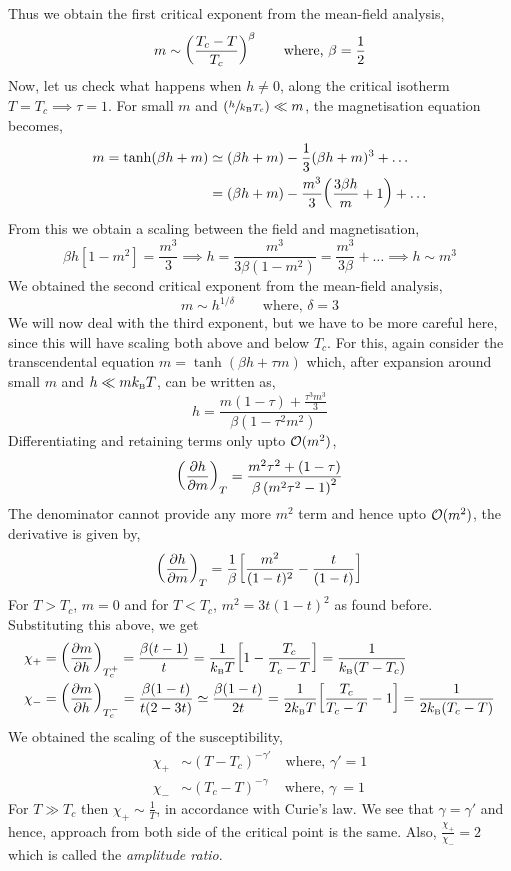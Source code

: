 Thus we obtain the first critical exponent from the mean-field analysis,
$${m\sim \qty(\frac{T_c-T}{T_c})^{\beta} \qquad\text{where, } \beta= \frac{1}{2}}$$
Now, let us check what happens when $h\neq 0$, along the critical isotherm $T=T_c \implies \tau=1$. For small $m$ and $ \qty(\sfrac{h}{k_{\text{\tiny B}} T_c}) \ll m$, the magnetisation equation becomes, 
\begin{align*}
    m = \tanh(\beta h + m) &\simeq (\beta h + m ) -\frac{1}{3}(\beta h + m )^3 + \ldots \\
    &=(\beta h + m ) -\frac{m^3}{3}\qty(\frac{3\beta h}{m} + 1 ) + \ldots
\end{align*}
From this we obtain a scaling between the field and magnetisation,
$$\beta h [1-m^2] = \frac{m^3}{3} \implies h = \frac{m^3}{3\beta(1-m^2)} = \frac{m^3}{3\beta}+\ldots\implies h \sim m^3$$
We obtained the second critical exponent from the mean-field analysis,
$${m\sim h^{1/\delta} \qquad\text{where, } \delta= 3}$$
We will now deal with the third exponent, but we have to be more careful here, since this will have scaling both above and below $T_c$. For this, again consider the transcendental equation $m = \tanh(\beta h + \tau m)$ which, after expansion around small $m$ and $h\ll m k_{\text{\tiny B}} T$, can be written as, 
$$h=\frac{m(1-\tau) +\frac{\tau^3 m^3}{3}}{\beta (1-\tau^2 m^2)}$$
Differentiating and retaining terms only upto $\mathcal O(m^2)$, 
$$\qty(\pdv{h}{m})_T = \frac{ m^2 \tau ^2 +(1-\tau)}{ \beta  \left(m^2 \tau ^2-1\right)^2}$$
The denominator cannot provide any more $m^2$ term and hence upto $\mathcal O(m^2)$, the derivative is given by, 
$$\qty(\pdv{h}{m})_T =  \frac{1}{\beta}\qty[\frac{m^2}{(1-t)^2} - \frac{t}{(1-t)}]$$
For $T>T_c$, $m=0$ and for $T<T_c$, $m^2 = 3t(1-t)^2$ as found before. Substituting this above, we get 
\begin{align*}
    \chi_+ &= \qty(\pdv{m}{h})_{T_c^+} = \frac{\beta (t-1)}{t} = \frac{1}{k_{\text{\tiny B}} T}\qty[1 - \frac{T_c}{T_c-T}] = \frac{1}{k_{\text{\tiny B}} (T -T_c)} \\
    \chi_- &= \qty(\pdv{m}{h})_{T_c^-} = \frac{\beta (1-t)}{t(2-3t)}\simeq \frac{\beta(1-t)}{2t} = \frac{1}{2k_{\text{\tiny B}} T }\qty[\frac{T_c}{T_c-T}-1] = \frac{1}{2k_{\text{\tiny B}} (T_c-T)}
\end{align*}
We obtained the scaling of the susceptibility, 
\begin{align*}
    \chi_+ &\sim (T-T_c)^{-\gamma'}\quad \text{where, }\gamma'=1\\
    \chi_- &\sim (T_c-T)^{-\gamma\ }\quad \text{where, }\gamma\ =1
\end{align*}
For $T\gg T_c$ then $\chi_+ \sim \frac{1}{T}$, in accordance with Curie's law. We see that $\gamma=\gamma'$ and hence, approach from both side of the critical point is the same. Also, $\frac{\chi_+}{\chi_-}=2 $ which is called the \textit{amplitude ratio}.
